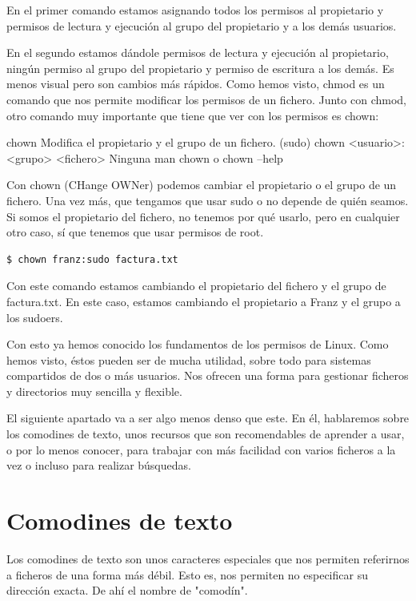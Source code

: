 En el primer comando estamos asignando todos los permisos al propietario y permisos de lectura y ejecución al grupo del propietario y a los demás usuarios.

En el segundo estamos dándole permisos de lectura y ejecución al propietario, ningún permiso al grupo del propietario y permiso de escritura a los demás. Es menos visual pero son cambios más rápidos.
Como hemos visto, chmod es un comando que nos permite modificar los permisos de un fichero. Junto con chmod, otro comando muy importante que tiene que ver con los permisos es chown:

\begin{command-info}
{chown}
{Modifica el propietario y el grupo de un fichero.}
{(sudo) chown <usuario>:<grupo> <fichero>}
{Ninguna}
{man chown o chown --help}
\end{command-info}

Con chown (CHange OWNer) podemos cambiar el propietario o el grupo de un fichero.  Una vez más, que tengamos que usar sudo o no depende de quién seamos. Si somos el propietario del fichero, no tenemos por qué usarlo, pero en cualquier otro caso, sí que tenemos que usar permisos de root.

\begin{tcolorbox-code}
\begin{lstlisting}
$ chown franz:sudo factura.txt
\end{lstlisting}
\end{tcolorbox-code}

Con este comando estamos cambiando el propietario del fichero y el grupo de factura.txt. En este caso, estamos cambiando el propietario a Franz y el grupo a los sudoers. 

Con esto ya hemos conocido los fundamentos de los permisos de Linux. Como hemos visto, éstos pueden ser de mucha utilidad, sobre todo para sistemas compartidos de dos o más usuarios. Nos ofrecen una forma para gestionar ficheros y directorios muy sencilla y flexible.

El siguiente apartado va a ser algo menos denso que este. En él, hablaremos sobre los comodines de texto, unos recursos que son recomendables de aprender a usar, o por lo menos conocer, para trabajar con más facilidad con varios ficheros a la vez o incluso para realizar búsquedas.

\section{Comodines de texto}
Los comodines de texto son unos caracteres especiales que nos permiten referirnos a ficheros de una forma más débil. Esto es, nos permiten no especificar su dirección exacta. De ahí el nombre de "comodín".

